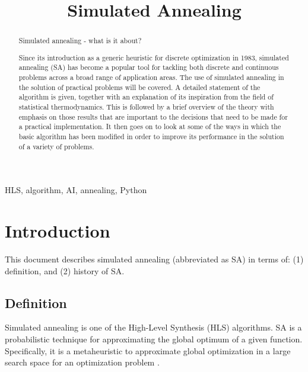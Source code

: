 \documentclass[conference]{IEEEtran}
\begin{document}
\title{Simulated Annealing}

\author{

}

\maketitle

\begin{abstract}
Simulated annealing - what is it about?

Since its introduction as a generic heuristic for discrete optimization in 1983, simulated annealing (SA) has become a popular tool for tackling both discrete and continuous problems across a broad range of application areas.  The use of simulated annealing in the solution of practical problems will be covered. A detailed statement of the algorithm is given, together with an explanation of its inspiration from the field of statistical thermodynamics. This is followed by a brief overview of the theory with emphasis on those results that are important to the decisions that need to be made for a practical implementation. It then goes on to look at some of the ways in which the basic algorithm has been modified in order to improve its performance in the solution of a variety of problems.
\end{abstract}

\begin{IEEEkeywords}
HLS, algorithm, AI, annealing, Python
\end{IEEEkeywords}

\section{Introduction}
This document describes simulated annealing (abbreviated as SA) in terms of: (1) definition, and (2) history of SA.

\subsection{Definition}
Simulated annealing is one of the High-Level Synthesis (HLS) algorithms. SA is a probabilistic technique for approximating the global optimum of a given function. Specifically, it is a metaheuristic to approximate global optimization in a large search space for an optimization problem \cite{b1}.
\end{document}
